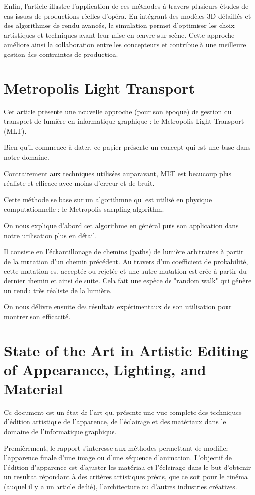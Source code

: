 \documentclass[runningheads]{llncs}
\begin{document}
Enfin, l’article illustre l’application de ces méthodes à travers plusieurs études de cas issues de productions réelles d’opéra. 
En intégrant des modèles 3D détaillés et des algorithmes de rendu avancés, la simulation permet d’optimiser les choix artistiques et techniques 
avant leur mise en œuvre sur scène. Cette approche améliore ainsi la collaboration entre les concepteurs et contribue à une meilleure gestion 
des contraintes de production.

\section{Metropolis Light Transport}

Cet article présente une nouvelle approche (pour son époque) de gestion du transport de lumière en informatique graphique : le Metropolis Light Transport (MLT). 

Bien qu'il commence à dater, ce papier présente un concept qui est une base dans notre domaine.

Contrairement aux techniques utilisées auparavant, MLT est beaucoup plus réaliste et efficace avec moins d'erreur et de bruit.

Cette méthode se base sur un algorithmne qui est utilisé en physique computationnelle : le Metropolis sampling algorithm.

On nous explique d'abord cet algorithme en général puis son application dans notre utilisation plus en détail.

Il consiste en l'échantillonage de chemins (paths) de lumière arbitraires à partir de la mutation d'un chemin précédent. Au travers d'un coefficient de probabilité, cette mutation est acceptée ou rejetée et une autre mutation est crée à partir du dernier chemin et ainsi de suite. Cela fait une espèce de "random walk" qui génère un rendu très réaliste de la lumière.

On nous délivre ensuite des résultats expérimentaux de son utilisation pour montrer son efficacité. 

\section{State of the Art in Artistic Editing of Appearance, Lighting, and Material}
Ce document est un état de l'art qui présente une vue complete des techniques d'édition artistique de l'apparence, de l'éclairage et des matériaux dans le domaine
de l'informatique graphique.

Premièrement, le rapport s'interesse aux méthodes permettant de modifier l'apparence finale d'une image ou d'une séquence d'animation.
L'objectif de l'édition d'apparence est d'ajuster les matériau et l'éclairage dans le but d'obtenir un resultat répondant à des critères artistiques
précis, que ce soit pour le cinéma (auquel il y a un article dedié), l'architecture ou d'autres industries créatives.
\end{document}
